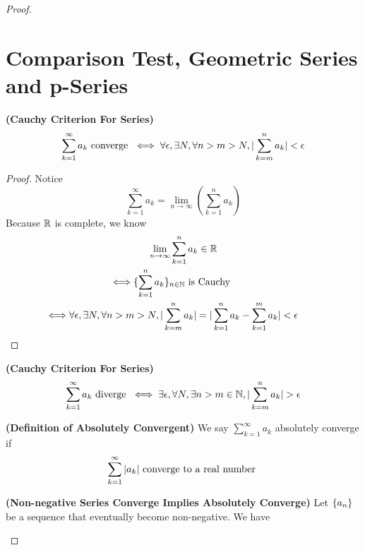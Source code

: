 \documentclass{report}
\begin{document}
\begin{proof}
\section{Comparison Test, Geometric Series and p-Series}
\begin{theorem}
\label{4.2.1}
\textbf{(Cauchy Criterion For Series)} 
\begin{equation}
  \sum_{k=1}^\infty a_k\text{ converge }\iff \forall \epsilon , \exists N, \forall n>m>N, |\sum_{k=m}^n a_k|<\epsilon   
\end{equation}
\end{theorem}
\begin{proof}
Notice 
\begin{equation}
\sum_{k=1}^\infty a_k=\lim_{n\to\infty} (\sum_{k=1}^n a_k)
\end{equation}
Because $\mathbb{R}$ is complete, we know  
 \begin{gather}
\lim_{n\to\infty}\sum_{k=1}^n a_k\inr\\
\liff \set{\sum_{k=1}^n a_k}_{n\inn}\text{ is Cauchy }\\
\liff \forall \epsilon ,\exists N,\forall n>m>N, \abso{\sum_{k=m}^n a_k}=\abso{\sum_{k=1}^n a_k- \sum_{k=1}^m a_k}<\epsilon 
\end{gather}
\end{proof}
\begin{corollary}
\label{4.2.2}
\textbf{(Cauchy Criterion For Series)} 
\begin{equation}
  \sum_{k=1}^\infty a_k\text{ diverge }\iff \exists \epsilon, \forall N, \exists  n>m \inn, \abso{\sum_{k=m}^n a_k}>\epsilon 
\end{equation}
\end{corollary}
\begin{definition}
\label{4.2.3}
\textbf{(Definition of Absolutely Convergent)} We say $\sum_{k=1}^\infty a_k$ absolutely converge if 
\begin{equation}
 \sum_{k=1}^\infty |a_k| \text{ converge to a real number }
\end{equation}
\end{definition}
\begin{theorem}
\label{4.2.4}
\textbf{(Non-negative Series Converge Implies Absolutely Converge)} Let $\{ a_n \}$ be a sequence that eventually become non-negative. We have

\end{theorem}
\end{proof}
\end{document}
